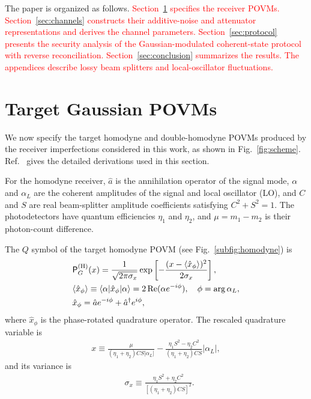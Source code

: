 \documentclass[%
final, 
superscriptaddress,
 amsmath,amssymb,amsfonts,
 aps,
 pra,
 longbibliography,
]{revtex4-2}
\newcommand{\ket}[1]{\ensuremath{|{#1}\rangle}}
\newcommand{\bra}[1]{\ensuremath{\langle{#1}|}}
\newcommand{\avr}[1]{\ensuremath{\langle{#1}\rangle}}
\renewcommand{\Re}{\mathop{\rm Re}\nolimits}
\newcommand{\ind}[1]{\mathrm{#1}}
\newcommand{\prob}{\mathsf{P}}
\begin{document}
The paper is organized as follows. \textcolor{red}{Section~\ref{sec:POVMs} specifies the receiver POVMs. Section~\ref{sec:channels} constructs their additive-noise and attenuator representations and derives the channel parameters. Section~\ref{sec:protocol} presents the security analysis of the Gaussian-modulated coherent-state protocol with reverse reconciliation. Section~\ref{sec:conclusion} summarizes the results. The appendices describe lossy beam splitters and local-oscillator fluctuations.}

\section{Target Gaussian POVMs}\label{sec:POVMs}
We now specify the target homodyne and double-homodyne POVMs produced by the receiver imperfections considered in this work, as shown in Fig.~\ref{fig:scheme}. Ref.~\cite{naumchik2025asymmetryeffectshomodyneheterodyne} gives the detailed derivations used in this section.

For the homodyne receiver, $\hat a$ is the annihilation operator of the signal mode, $\alpha$ and $\alpha_L$ are the coherent amplitudes of the signal and local oscillator (LO), and $C$ and $S$ are real beam-splitter amplitude coefficients satisfying $C^2+S^2=1$. The photodetectors have quantum efficiencies $\eta_1$ and $\eta_2$, and $\mu=m_1-m_2$ is their photon-count difference.

The $Q$ symbol of the target homodyne POVM (see Fig.~\ref{subfig:homodyne}) is
\begin{align}
  &\label{eq:Pgood-w-def}
    {\prob}_G^{(\ind{H})}(x)=\frac{1}{\sqrt{2\pi\sigma_x}}
    \exp \left[-\frac{(x-\avr{\hat{x}_\phi})^2}{2\sigma_x}\right],\\
  &\label{eq:avr-x-phi}
  \avr{\hat{x}_\phi}\equiv \bra{\alpha}\hat{x}_\phi\ket{\alpha}=2\Re(\alpha e^{-i\phi}),
  \quad \phi=\arg\alpha_L,\\
    &\label{eq:quad-op}
    \hat{x}_\phi=\hat{a}e^{-i\phi}+\hat{a}^\dag e^{i\phi},
\end{align}
where $\hat{x}_\phi$ is the phase-rotated quadrature operator. The rescaled quadrature variable is
\begin{align}
  \label{eq:x-def}
  x\equiv\frac{\mu}{(\eta_1+\eta_2)CS\left|\alpha_L\right|}-\frac{\eta_1S^2-\eta_2C^2}{\left(\eta_1+\eta_2\right)CS}\left|\alpha_L\right|,
\end{align}
and its variance is
\begin{align}
  &
        \label{eq:sigma-x}
    \sigma_x\equiv
    \frac{\eta_1S^2+\eta_2C^2}{
    \left[(\eta_1+\eta_2)CS\right]^2
    }.
\end{align}
\end{document}
